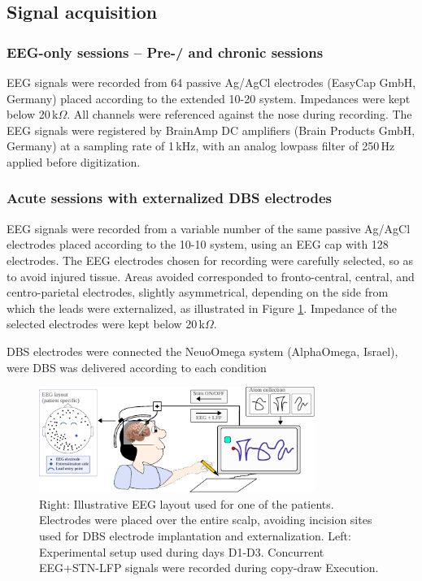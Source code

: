 \documentclass[10pt,a4paper]{article}
\begin{document}
\subsection{Signal acquisition}
\subsubsection{EEG-only sessions -- Pre-/ and chronic sessions}
EEG signals were recorded from 64 passive Ag/AgCl electrodes (EasyCap GmbH, Germany) placed according to the extended 10-20 system. Impedances were kept below 20\,k$\Omega$. All channels were referenced against the nose during recording. The EEG signals were registered by BrainAmp DC amplifiers (Brain Products GmbH, Germany) at a sampling rate of 1\,kHz, with an analog lowpass filter of 250\,Hz applied before digitization.

\subsubsection{Acute sessions with externalized DBS electrodes}
EEG signals were recorded from a variable number of the same passive Ag/AgCl electrodes placed according to the 10-10 system, using an EEG cap with 128 electrodes. The EEG electrodes chosen for recording were carefully selected, so as to avoid injured tissue. Areas avoided corresponded to fronto-central, central, and centro-parietal electrodes, slightly asymmetrical, depending on the side from which the leads were externalized, as illustrated in Figure \ref{fig:paradigm_layout}. Impedance of the selected electrodes were kept below 20\,k$\Omega$.

DBS electrodes were connected the NeuoOmega system (AlphaOmega, Israel), were DBS was delivered according to each condition

\begin{figure}[h!]
\centering
\includegraphics[width=0.8\textwidth]{figures/paradigm_layout}
\caption{Right: Illustrative EEG layout used for one of the patients. Electrodes were placed over the entire scalp, avoiding incision sites used for DBS electrode implantation and externalization. Left: Experimental setup used during days D1-D3. Concurrent EEG+STN-LFP signals were recorded during copy-draw Execution.}
\label{fig:paradigm_layout}
\end{figure}
\end{document}
